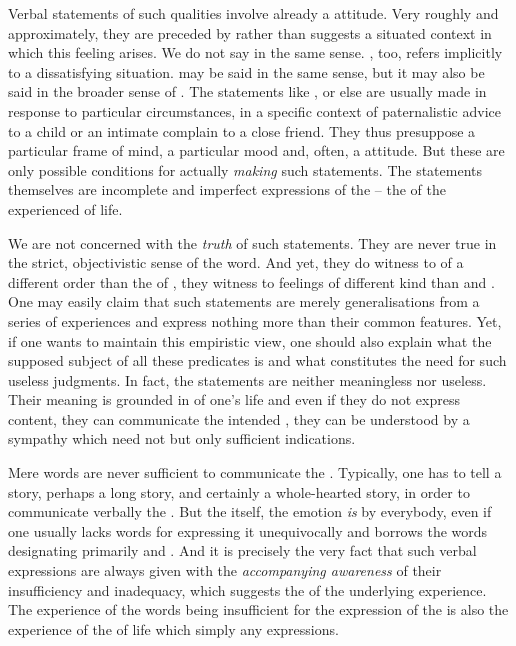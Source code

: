 Verbal statements of such qualities involve already a 
attitude.  Very roughly and approximately, they are preceded by 
rather than   suggests a situated context in
which this feeling arises. We do not say  in the same sense.
, too, refers implicitly to a dissatisfying
situation.  may be said in the same sense, but it may also
be said in the broader sense of .  The statements
like , or else  are usually made in response to
particular circumstances, in a specific context of paternalistic advice to a
child or an intimate complain to a close friend. They thus presuppose a
particular frame of mind, a particular mood and, often, a 
attitude.  But these are only possible conditions for actually {\em making} such
statements. The statements themselves are incomplete and imperfect expressions
of the  -- the  of the experienced  of
 life.

We are not concerned with the {\em truth} of such statements. They are never
true in the strict, objectivistic sense of the word. And yet, they do witness to
 of a different order than the  of
, they witness to feelings of different kind than  and
.  One may easily claim that such statements are merely
generalisations from a series of experiences and express nothing more than their
common features. Yet, if one wants to maintain this empiristic view, one should
also explain what the supposed subject of all these predicates is and what
constitutes the need for such useless judgments. In fact, the statements are neither
meaningless nor useless. Their meaning is grounded in  of
one's life and even if they do not express  content, they can communicate
the intended , they can be understood by a sympathy which need not
 but only sufficient indications.


Mere words  are  never sufficient to communicate the
.  Typically, one has to tell a story, perhaps a long story,
and certainly a whole-hearted story, in order to communicate verbally the
.  But the  itself, the {emotion} {\em is}
 by everybody, even if one usually lacks words for expressing it
unequivocally and borrows the words designating primarily  and
.  And it is precisely the very fact that such verbal
expressions are always given with the {\em accompanying awareness} of their
insufficiency and inadequacy, which suggests the  of the underlying
experience. The experience of the words being insufficient for the expression of
the  is also the experience of the  of life which
simply  any  expressions.

